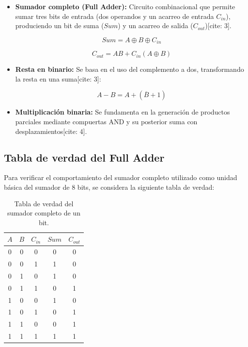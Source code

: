 \documentclass[12pt,a4paper]{article}
\begin{document}
\begin{itemize}
    \item \textbf{Sumador completo (Full Adder):} Circuito combinacional que permite sumar tres bits de entrada (dos operandos y un acarreo de entrada $C_{in}$), produciendo un bit de suma ($Sum$) y un acarreo de salida ($C_{out}$)[cite: 3].

    \begin{equation}
        Sum = A \oplus B \oplus C_{in}
    \end{equation}

    \begin{equation}
        C_{out} = AB + C_{in}(A \oplus B)
    \end{equation}

    \item \textbf{Resta en binario:} Se basa en el uso del complemento a dos, transformando la resta en una suma[cite: 3]:

    \begin{equation}
        A - B = A + (\overline{B} + 1)
    \end{equation}

    \item \textbf{Multiplicación binaria:} Se fundamenta en la generación de productos parciales mediante compuertas AND y su posterior suma con desplazamientos[cite: 4].
\end{itemize}

\subsection{Tabla de verdad del Full Adder}

Para verificar el comportamiento del sumador completo utilizado como unidad básica del sumador de 8 bits, se considera la siguiente tabla de verdad:

\begin{table}[H]
    \centering
    \begin{tabular}{ccccc}
        \toprule
        $A$ & $B$ & $C_{in}$ & $Sum$ & $C_{out}$ \\
        \midrule
        0 & 0 & 0 & 0 & 0 \\
        0 & 0 & 1 & 1 & 0 \\
        0 & 1 & 0 & 1 & 0 \\
        0 & 1 & 1 & 0 & 1 \\
        1 & 0 & 0 & 1 & 0 \\
        1 & 0 & 1 & 0 & 1 \\
        1 & 1 & 0 & 0 & 1 \\
        1 & 1 & 1 & 1 & 1 \\
        \bottomrule
    \end{tabular}
    \caption{Tabla de verdad del sumador completo de un bit.}
    \label{tab:fulladder}
\end{table}
\end{document}
